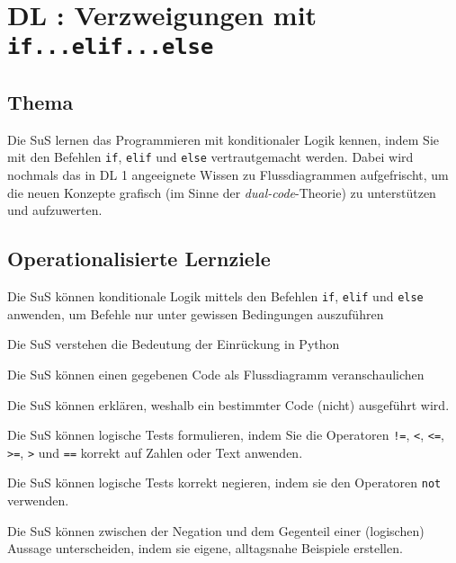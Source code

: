 \section{DL \themycounter: Verzweigungen mit \texorpdfstring{\lstinline|if...elif...else|}{if...elif...else}}
\begin{myExBox}[title=DL \themycounter]
\subsection*{Thema}
Die SuS lernen das Programmieren mit konditionaler Logik kennen, indem Sie mit den Befehlen \lstinline|if|, \lstinline|elif| und \lstinline|else| vertrautgemacht werden. Dabei wird nochmals das in DL 1 angeeignete Wissen zu Flussdiagrammen aufgefrischt, um die neuen Konzepte grafisch (im Sinne der \textit{dual-code}-Theorie) zu unterstützen und aufzuwerten.

\subsection*{Operationalisierte Lernziele}
\begin{todolist}
    \item Die SuS können konditionale Logik mittels den Befehlen \lstinline|if|, \lstinline|elif| und \lstinline|else| anwenden, um Befehle nur unter gewissen Bedingungen auszuführen
    \item Die SuS verstehen die Bedeutung der Einrückung in Python
    \item Die SuS können einen gegebenen Code als Flussdiagramm veranschaulichen
    \item Die SuS können erklären, weshalb ein bestimmter Code (nicht) ausgeführt wird.
    \item Die SuS können logische Tests formulieren, indem Sie die Operatoren \lstinline|!=|, \lstinline|<|, \lstinline|<=|, \lstinline|>=|, \lstinline|>| und \lstinline|==| korrekt auf Zahlen oder Text anwenden.
    \item Die SuS können logische Tests korrekt negieren, indem sie den Operatoren \lstinline|not| verwenden.
    \item Die SuS können zwischen der Negation und dem Gegenteil einer (logischen) Aussage unterscheiden, indem sie eigene, alltagsnahe Beispiele erstellen.
\end{todolist}


\end{myExBox}
